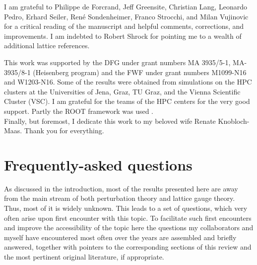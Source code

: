 \documentclass[final,twoside,12pt]{article}
\newcommand*{\1}{1\!\!\!\bot}
\begin{document}
I am grateful to Philippe de Forcrand, Jeff Greensite, Christian Lang, Leonardo Pedro, Erhard Seiler, Ren\'e Sondenheimer, Franco Strocchi, and Milan Vujinovic for a critical reading of the manuscript and helpful comments, corrections, and improvements. I am indebted to Robert Shrock for pointing me to a wealth of additional lattice references.

This work was supported by the DFG under grant numbers MA 3935/5-1, MA-3935/8-1 (Heisenberg program) and the FWF under grant numbers M1099-N16 and W1203-N16. Some of the results were obtained from simulations on the HPC clusters at the Universities of Jena, Graz, TU Graz, and the Vienna Scientific Cluster (VSC). I am grateful for the teams of the HPC centers for the very good support. Partly the ROOT framework was used \cite{Brun:1997pa}.\\

Finally, but foremost, I dedicate this work to my beloved wife Renate Knobloch-Maas. Thank you for everything.

\appendix

\section{Frequently-asked questions}\label{s:faq}

As discussed in the introduction, most of the results presented here are away from the main stream of both perturbation theory and lattice gauge theory. Thus, most of it is widely unknown. This leads to a set of questions, which very often arise upon first encounter with this topic. To facilitate such first encounters and improve the accessibility of the topic here the questions my collaborators and myself have encountered most often over the years are assembled and briefly answered, together with pointers to the corresponding sections of this review and the most pertinent original literature, if appropriate.
\end{document}
